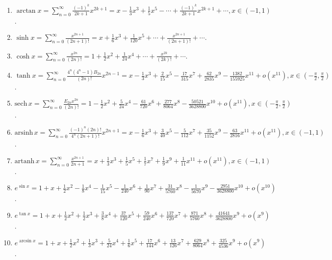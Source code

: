 \documentclass[../../main.tex]{subfiles}%
\begin{document}
\begin{enumerate}
\\
\item $\arctan x=\sum_{n=0}^{\infty}\frac{(-1)^k}{2k+1}x^{2k+1}=x-\frac{1}{3}x^3+\frac{1}{5}x^5-\cdots+\frac{(-1)^k}{2k+1}x^{2k+1}+\cdots,x\in(-1,1)$.
\\
\item $\sinh x=\sum_{n=0}^{\infty}\frac{x^{2n+1}}{(2n+1)!}=x+\frac{1}{6}x^3+\frac{1}{120}x^5+\cdots+\frac{x^{2n+1}}{(2n+1)!}+\cdots$.
\\
\item $\cosh x=\sum_{n=0}^{\infty}\frac{x^{2n}}{(2n)!}=1+\frac{1}{2}x^2+\frac{1}{24}x^4+\cdots+\frac{x^{2k}}{(2k)!}+\cdots$.
\\
\item $\tanh x=\sum_{n=0}^{\infty}\frac{4^n(4^n-1)B_{2n}}{(2n)!}x^{2n-1}=x-\frac{1}{3}x^3+\frac{2}{15}x^5-\frac{17}{315}x^7+\frac{62}{2835}x^9-\frac{1382}{155925}x^{11}+o(x^{11}),x\in\left(-\frac{\pi}{2},\frac{\pi}{2}\right)$.
\\
\item $\text{sech}\,x=\sum_{n=0}^{\infty}\frac{E_{2n}x^{2n}}{(2n)!}=1-\frac{1}{2}x^2+\frac{5}{24}x^4-\frac{61}{720}x^6+\frac{277}{8064}x^8-\frac{50521}{3628800}x^{10}+o(x^{11}),x\in\left(-\frac{\pi}{2},\frac{\pi}{2}\right)$.
\\
\item $\text{arsinh}\,x=\sum_{n=0}^{\infty}\frac{(-1)^n(2n)!}{4^n(2n+1)!}x^{2n+1}=x-\frac{1}{6}x^3+\frac{3}{40}x^5-\frac{5}{112}x^7+\frac{35}{1152}x^9-\frac{63}{2816}x^{11}+o(x^{11}),x\in(-1,1)$.
\\
\item $\text{artanh}\,x=\sum_{n=0}^{\infty}\frac{x^{2n+1}}{2n+1}=x+\frac{1}{3}x^3+\frac{1}{5}x^5+\frac{1}{7}x^7+\frac{1}{9}x^9+\frac{1}{11}x^{11}+o(x^{11}),x\in(-1,1)$.
\\
\item $e^{\sin x}=1+x+\frac{1}{2}x^2-\frac{1}{8}x^4-\frac{1}{15}x^5-\frac{1}{240}x^6+\frac{1}{90}x^7+\frac{31}{5760}x^8-\frac{1}{5670}x^9-\frac{2951}{3628800}x^{10}+o(x^{10})$.
\\
\item $e^{\tan x}=1+x+\frac{1}{2}x^2+\frac{1}{2}x^3+\frac{3}{8}x^4+\frac{37}{120}x^5+\frac{59}{240}x^6+\frac{137}{720}x^7+\frac{871}{5760}x^8+\frac{41641}{3628800}x^9+o(x^9)$.
\\
\item $e^{\arcsin x}=1+x+\frac{1}{2}x^2+\frac{1}{3}x^3+\frac{5}{24}x^4+\frac{1}{6}x^5+\frac{17}{144}x^6+\frac{13}{126}x^7+\frac{629}{8064}x^8+\frac{325}{4536}x^9+o(x^9)$.
\\

\end{enumerate}
\end{document}
